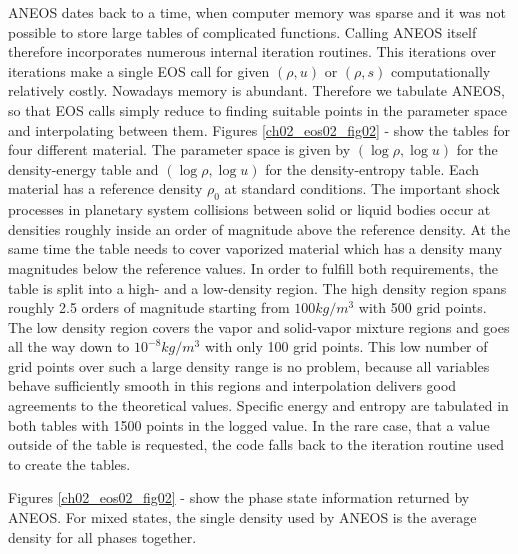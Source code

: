 ANEOS dates back to a time, when computer memory was sparse and it was not possible to store large tables of complicated functions. Calling ANEOS itself therefore incorporates numerous internal iteration routines. This iterations over iterations make a single EOS call for given $(\rho, u)$ or $(\rho, s)$ computationally relatively costly. Nowadays memory is abundant. Therefore we tabulate ANEOS, so that EOS calls simply reduce to finding suitable points in the parameter space and interpolating between them. Figures \ref{ch02_eos02_fig02} - \label{ch02_eos02_fig05} show the tables for four different material. The parameter space is given by $(\log \rho, \log u)$ for the density-energy table and $(\log \rho, \log u)$ for the density-entropy table. Each material has a reference density $\rho_0$ at standard conditions. The important shock processes in planetary system collisions between solid or liquid bodies occur at densities roughly inside an order of magnitude above the reference density. At the same time the table needs to cover vaporized material which has a density many magnitudes below the reference values. In order to fulfill both requirements, the table is split into a high- and a low-density region. The high density region spans roughly 2.5 orders of magnitude starting from $100kg/m^3$ with 500 grid points. The low density  region covers the vapor and solid-vapor mixture regions and goes all the way down to $10^{-8}kg/m^3$ with only 100 grid points. This low number of grid points over such a large density range is no problem, because all variables behave sufficiently smooth in this regions and interpolation delivers good agreements to the theoretical values. Specific energy and entropy are tabulated in both tables with 1500 points in the logged value. In the rare case, that a value outside of the table is requested, the code falls back to the iteration routine used to create the tables. 

Figures \ref{ch02_eos02_fig02} - \label{ch02_eos02_fig05} show the phase state information returned by ANEOS. For mixed states, the single density used by ANEOS is the average density for all phases together.

